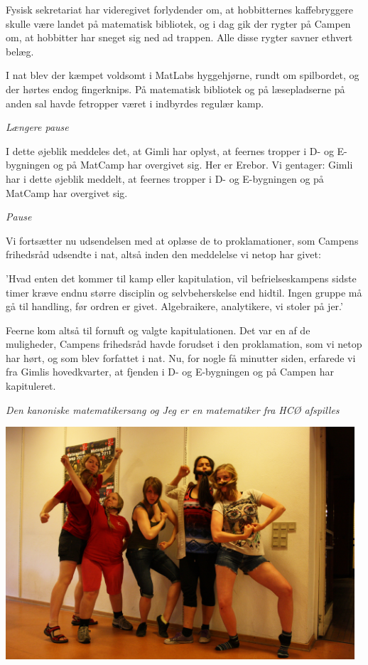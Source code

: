 \begin{minipage}[t]{170mm}
Fysisk sekretariat har videregivet forlydender om, at hobbitternes kaffebryggere skulle være landet på matematisk bibliotek, og i dag gik der rygter på Campen om, at hobbitter har sneget sig ned ad trappen. Alle disse rygter savner ethvert belæg.

I nat blev der kæmpet voldsomt i MatLabs hyggehjørne, rundt om spilbordet, og der hørtes endog fingerknips. På matematisk bibliotek og på læsepladserne på anden sal havde fetropper været i indbyrdes regulær kamp.

\emph{Længere pause}

I dette øjeblik meddeles det, at Gimli har oplyst, at feernes tropper i D- og E-bygningen og på MatCamp har overgivet sig. Her er Erebor. Vi gentager: Gimli har i dette øjeblik meddelt, at feernes tropper i D- og E-bygningen og på MatCamp har overgivet sig.

\emph{Pause}

Vi fortsætter nu udsendelsen med at oplæse de to proklamationer, som Campens frihedsråd udsendte i nat, altså inden den meddelelse vi netop har givet:

'Hvad enten det kommer til kamp eller kapitulation, vil befrielseskampens sidste timer kræve endnu større disciplin og selvbeherskelse end hidtil. Ingen gruppe må gå til handling, før ordren er givet. Algebraikere, analytikere, vi stoler på jer.'

Feerne kom altså til fornuft og valgte kapitulationen. Det var en af de muligheder, Campens frihedsråd havde forudset i den proklamation, som vi netop har hørt, og som blev forfattet i nat. Nu, for nogle få minutter siden, erfarede vi fra Gimlis hovedkvarter, at fjenden i D- og E-bygningen og på Campen har kapituleret.

\emph{Den kanoniske matematikersang og Jeg er en matematiker fra HCØ afspilles}

\begin{center}
\vspace{3mm}
\includegraphics[width=130mm]{dvaergetropper.jpg}
\end{center}
\end{minipage}
